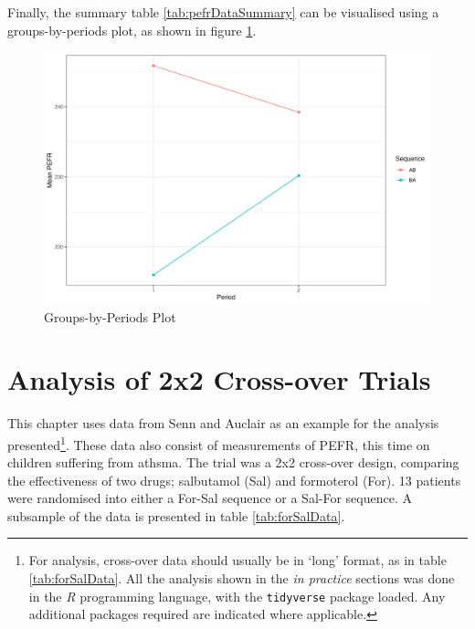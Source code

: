 \documentclass[12pt, TexShade, letterpaper]{report}
\begin{document}
Finally, the summary table \ref{tab:pefrDataSummary} can be visualised using a groups-by-periods plot, as shown in figure \ref{fig:groupsbyperiods}.
\begin{figure}[hbt]
    \centering
    \includegraphics[width=0.85\linewidth]{report/figures/ch2/groupsByPeriodsPlot.png}
    \caption{Groups-by-Periods Plot}
    \label{fig:groupsbyperiods}
\end{figure}

\chapter{Analysis of 2x2 Cross-over Trials} \label{analysis}
This chapter uses data from Senn and Auclair \cite{senn1990graphical} as an example for the analysis presented\footnote{For analysis, cross-over data should usually be in `long' format, as in table \ref{tab:forSalData}. All the analysis shown in the \textit{in practice} sections was done in the \textit{R} programming language, with the \texttt{tidyverse} package loaded. Any additional packages required are indicated where applicable.}. These data also consist of measurements of PEFR, this time on children suffering from athsma. The trial was a 2x2 cross-over design, comparing the effectiveness of two drugs; salbutamol (Sal) and formoterol (For). 13 patients were randomised into either a For-Sal sequence or a Sal-For sequence. A subsample of the data is presented in table \ref{tab:forSalData}.


\end{document}
